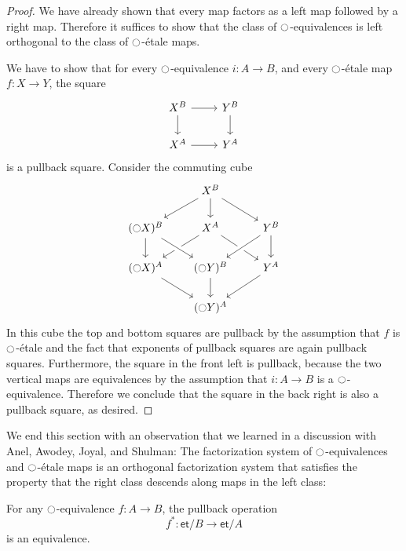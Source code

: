 \documentclass[9pt,twosided]{amsart}
\newcommand{\et}{\mathsf{et}}
\begin{document}
\begin{proof}
  We have already shown that every map factors as a left map followed by a right map. Therefore it suffices to show that the class of ${\ocircle}$-equivalences is left orthogonal to the class of ${\ocircle}$-\'etale maps.
  
We have to show that for every ${\ocircle}$-equivalence $i:A\to B$, and every ${\ocircle}$-\'etale map $f:X\to Y$, the square
\begin{equation*}
\begin{tikzcd}
X^B \arrow[r] \arrow[d] & Y^B \arrow[d] \\
X^A \arrow[r] & Y^A
\end{tikzcd}
\end{equation*}
is a pullback square. Consider the commuting cube
\begin{equation*}
\begin{tikzcd}
&[-1ex] X^B \arrow[dl] \arrow[d] \arrow[dr] \\
(\modal X)^B \arrow[d] & X^A \arrow[dl] \arrow[dr] & Y^B \arrow[d] \arrow[dl,crossing over] \\
(\modal X)^A \arrow[dr] & (\modal Y)^B \arrow[from=ul,crossing over] \arrow[d] & Y^A \arrow[dl] \\
& (\modal Y)^A
\end{tikzcd}
\end{equation*}
In this cube the top and bottom squares are pullback by the assumption that $f$ is ${\ocircle}$-\'etale and the fact that exponents of pullback squares are again pullback squares. Furthermore, the square in the front left is pullback, because the two vertical maps are equivalences by the assumption that $i:A\to B$ is a ${\ocircle}$-equivalence. Therefore we conclude that the square in the back right is also a pullback square, as desired.
\end{proof}

We end this section with an observation that we learned in a discussion with Anel, Awodey, Joyal, and Shulman: The factorization system of ${\ocircle}$-equivalences and ${\ocircle}$-\'etale maps is an orthogonal factorization system that satisfies the property that the right class descends along maps in the left class:

\begin{prp}
  For any ${\ocircle}$-equivalence $f:A\to B$, the pullback operation
  \begin{equation*}
    f^\ast : \et/B\to\et/A
  \end{equation*}
  is an equivalence.
\end{prp}
\end{document}
